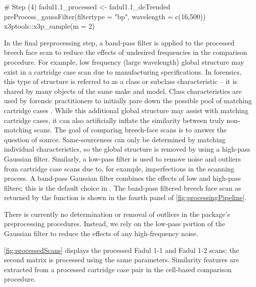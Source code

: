 \begin{Schunk}
\begin{Sinput}
# Step (4)
fadul1.1_processed <- fadul1.1_deTrended %
  preProcess_gaussFilter(filtertype = "bp", wavelength = c(16,500)) %
  x3ptools::x3p_sample(m = 2)
\end{Sinput}
\end{Schunk}

In the final preprocessing step, a band-pass filter is applied to the
processed breech face scan to reduce the effects of undesired
frequencies in the comparison procedure. For example, low frequency
(large wavelength) global structure may exist in a cartridge case scan
due to manufacturing specifications. In forensics, this type of
structure is referred to as a class or subclass characteristic -- it is
shared by many objects of the same make and model. Class characteristics
are used by forensic practitioners to initially pare down the possible
pool of matching cartridge cases \citep{firearm_id_thompson}. While this
additional global structure may assist with matching cartridge cases, it
can also artificially inflate the similarity between truly non-matching
scans. The goal of comparing breech-face scans is to answer the question
of source. Same-sourceness can only be determined by matching individual
characteristics, so the global structure is removed by using a high-pass
Gaussian filter. Similarly, a low-pass filter is used to remove noise
and outliers from cartridge case scans due to, for example,
imperfections in the scanning process. A band-pass Gaussian filter
combines the effects of low and high-pass filters; this is the default
choice in . The band-pass filtered breech face scan as
returned by the  function is shown in the
fourth panel of \autoref{fig:processingPipeline}.

There is currently no determination or removal of outliers in the
 package's preprocessing procedures. Instead, we rely on
the low-pass portion of the Gaussian filter to reduce the effects of any
high-frequency noise.

\autoref{fig:processedScans} displays the processed Fadul 1-1 and Fadul
1-2 scans; the second matrix is processed using the same parameters.
Similarity features are extracted from a processed cartridge case pair
in the cell-based comparison procedure.

